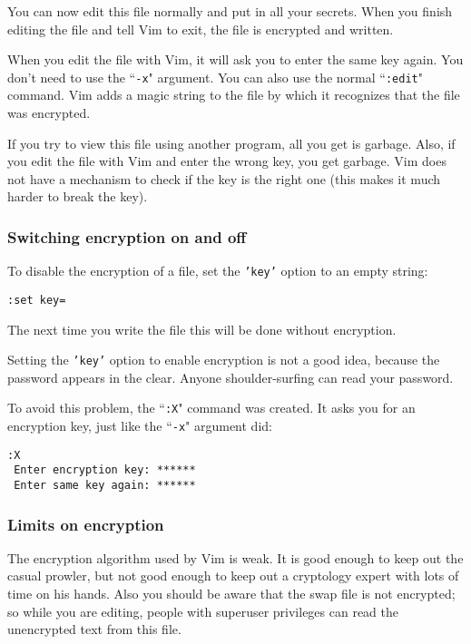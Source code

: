 You can now edit this file normally and put in all your secrets.
When you finish editing the file and tell Vim to exit, the file is encrypted and written.

When you edit the file with Vim, it will ask you to enter the same key again.
You don't need to use the ``\texttt{-x}" argument.
You can also use the normal ``\texttt{:edit}" command.
Vim adds a magic string to the file by which it recognizes that the file was encrypted.

If you try to view this file using another program, all you get is garbage.
Also, if you edit the file with Vim and enter the wrong key, you get garbage.
Vim does not have a mechanism to check if the key is the right one (this makes it much harder to break the key).
\subsubsection{Switching encryption on and off}
To disable the encryption of a file, set the \texttt{'key'} option to an empty string:

\begin{Verbatim}[samepage=true]
 :set key=
\end{Verbatim}

The next time you write the file this will be done without encryption.

Setting the \texttt{'key'} option to enable encryption is not a good idea, because the password appears in the clear.
Anyone shoulder-surfing can read your password.

To avoid this problem, the ``\texttt{:X}" command was created.
It asks you for an encryption key, just like the ``\texttt{-x}" argument did:

\begin{Verbatim}[samepage=true]
 :X
 Enter encryption key: ******
 Enter same key again: ******
\end{Verbatim}

\subsubsection{Limits on encryption}
The encryption algorithm used by Vim is weak.
It is good enough to keep out the casual prowler, but not good enough to keep out a cryptology expert with lots of time on his hands.
Also you should be aware that the swap file is not encrypted; so while you are editing, people with superuser privileges can read the unencrypted text from this file.

